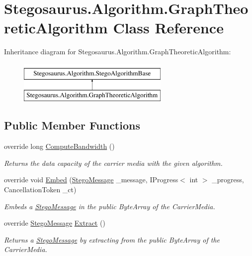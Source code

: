 \hypertarget{class_stegosaurus_1_1_algorithm_1_1_graph_theoretic_algorithm}{}\section{Stegosaurus.\+Algorithm.\+Graph\+Theoretic\+Algorithm Class Reference}
\label{class_stegosaurus_1_1_algorithm_1_1_graph_theoretic_algorithm}
Inheritance diagram for Stegosaurus.\+Algorithm.\+Graph\+Theoretic\+Algorithm\+:\begin{figure}[H]
\begin{center}
\leavevmode
\includegraphics[height=2.000000cm]{class_stegosaurus_1_1_algorithm_1_1_graph_theoretic_algorithm}
\end{center}
\end{figure}
\subsection*{Public Member Functions}
\begin{DoxyCompactItemize}
\item 
override long \hyperlink{class_stegosaurus_1_1_algorithm_1_1_graph_theoretic_algorithm_aa3c0280792593fa75af74a7e3b9e8acc}{Compute\+Bandwidth} ()
\begin{DoxyCompactList}\small\item\em Returns the data capacity of the carrier media with the given algorithm. \end{DoxyCompactList}\item 
override void \hyperlink{class_stegosaurus_1_1_algorithm_1_1_graph_theoretic_algorithm_aecdce8aef6a5723d66bc93ca6f959767}{Embed} (\hyperlink{class_stegosaurus_1_1_stego_message}{Stego\+Message} \+\_\+message, I\+Progress$<$ int $>$ \+\_\+progress, Cancellation\+Token \+\_\+ct)
\begin{DoxyCompactList}\small\item\em Embeds a \hyperlink{class_stegosaurus_1_1_stego_message}{Stego\+Message} in the public Byte\+Array of the Carrier\+Media. \end{DoxyCompactList}\item 
override \hyperlink{class_stegosaurus_1_1_stego_message}{Stego\+Message} \hyperlink{class_stegosaurus_1_1_algorithm_1_1_graph_theoretic_algorithm_ae12e30f823e7cedc1f3ae75fa8a914fb}{Extract} ()
\begin{DoxyCompactList}\small\item\em Returns a \hyperlink{class_stegosaurus_1_1_stego_message}{Stego\+Message} by extracting from the public Byte\+Array of the Carrier\+Media. \end{DoxyCompactList}\end{DoxyCompactItemize}
